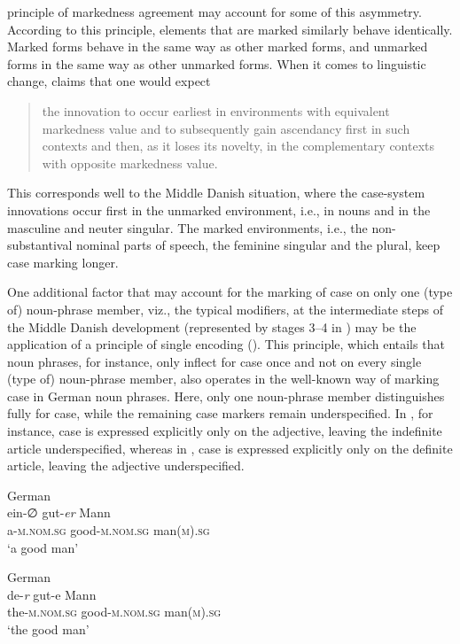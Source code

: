 \documentclass[output=paper]{langsci/langscibook}
\begin{document}
 principle of markedness agreement may account for some of this asymmetry. According to this principle, elements that are marked similarly behave identically. Marked forms behave in the same way as other marked forms, and unmarked forms in the same way as other unmarked forms. When it comes to linguistic change, \citet[36]{Andersen2001} claims that one would expect

\begin{quote}\sloppy
[…] the innovation to occur earliest in environments with equivalent markedness value and to subsequently gain ascendancy first in such contexts and then, as it loses its novelty, in the complementary contexts with opposite markedness value.
\end{quote}

This corresponds well to the Middle Danish situation, where the case-system innovations occur first in the unmarked environment, i.e., in nouns \citep[44]{Andersen1980} and in the masculine and neuter singular. The marked environments, i.e., the non-substantival nominal parts of speech, the feminine singular and the plural, keep case marking longer.

One additional factor that may account for the marking of case on only one (type of) noun-phrase member, viz., the typical modifiers, at the intermediate steps of the Middle Danish development (represented by stages 3–4 in ) may be the application of a principle of single encoding (\citealt[258--261]{Norde2001}). This principle, which entails that noun phrases, for instance, only inflect for case once and not on every single (type of) noun-phrase member, also operates in the well-known way of marking case in German noun phrases. Here, only one noun-phrase member distinguishes fully for case, while the remaining case markers remain underspecified. In , for instance, case is expressed explicitly only on the adjective, leaving the indefinite article underspecified, whereas in , case is expressed explicitly only on the definite article, leaving the adjective underspecified.

\ea \label{ex:hansen:23}
{German}\\
\gll ein-∅ gut-\textit{er} Mann\\
     a-\textsc{m.nom.sg} good-\textsc{m.nom.sg} man\textsc{(m).sg}\\
\glt ‘a good man’

\ex\label{ex:hansen:24}
{German}\\
\gll de-\textit{r} gut-e Mann\\
     the-\textsc{m.nom.sg} good-\textsc{m.nom.sg} man\textsc{(m).sg}\\
\glt ‘the good man’
\end{document}
